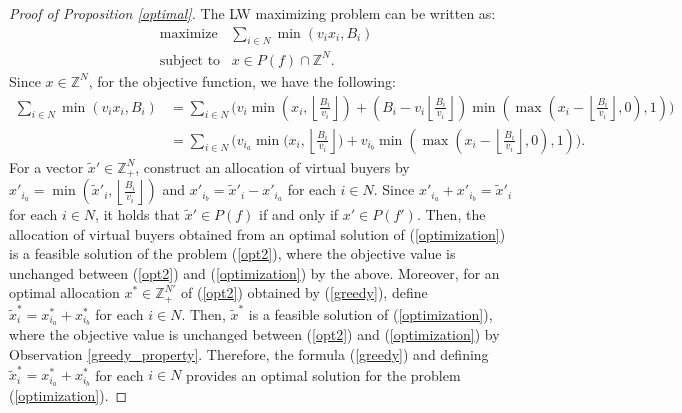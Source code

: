 \documentclass[letterpaper,11pt]{article}
\begin{document}
\begin{proof}[Proof of Proposition \ref{optimal}]
	The LW maximizing problem can be written as:
	\begin{align}
	\label{optimization}
	&{\text{maximize}}\ \ \ \ \sum_{i\in N}\min(v_i x_i,B_i) \\
	&\text{subject to}\ \ \ \, x\in P(f)\cap \mathbb Z^N. \nonumber
	\end{align}
	Since $x\in\mathbb Z^N$, for the objective function, we have the following: 
	\begin{align*}
	\sum_{i\in N}\min(v_i x_i,B_i)&=\sum_{i\in N}\bigl(v_{i}\min(x_{i},\left\lfloor \frac{B_i}{v_i}\right\rfloor)+(B_i-v_i\left\lfloor \frac{B_i}{v_i}\right\rfloor)\min(\max(x_{i}-\left\lfloor \frac{B_i}{v_i}\right\rfloor,0),1)\bigr)\\
	&=\sum_{i\in N}\bigl(v_{i_a}\min\bigl(x_{i},\left\lfloor \frac{B_i}{v_i}\right\rfloor\bigr)+v_{i_b}\min(\max(x_{i}-\left\lfloor \frac{B_i}{v_i}\right\rfloor,0),1)\bigr).
	\end{align*}
	For a vector $\tilde{x}'\in \mathbb Z^N_{+}$, construct an allocation of virtual buyers by 
	$x'_{i_a}=\min(\tilde{x}'_i, \left\lfloor \frac{B_i}{v_i}\right\rfloor)$ and $x'_{i_b}=\tilde{x}'_i-x'_{i_a}$ for each $i\in N$.
	Since $x'_{i_a}+x'_{i_b}=\tilde{x}'_i$ for each $i\in N$, 
	it holds that $\tilde{x}'\in P(f)$ if and only if $x'\in P(f')$.
	Then, the allocation of virtual buyers obtained from an optimal solution of (\ref{optimization}) is a feasible solution of 
	the problem (\ref{opt2}), where the objective value is unchanged between (\ref{opt2}) 
	and (\ref{optimization}) by the above.
	Moreover, for an optimal allocation $x^{*}\in \mathbb Z^{N'}_{+}$ of (\ref{opt2}) obtained by (\ref{greedy}), 
	define $\tilde{x}^*_i=x^*_{i_a}+x^*_{i_b}$ for each $i\in N$.
	Then, $\tilde{x}^*$ is a feasible solution of (\ref{optimization}), 
	where the objective value is unchanged between (\ref{opt2}) 
	and (\ref{optimization}) by Observation \ref{greedy_property}.
	Therefore, the formula (\ref{greedy}) and defining $\tilde{x}^*_i=x^*_{i_a}+x^*_{i_b}$ for each $i\in N$ 
	provides an optimal solution for the problem (\ref{optimization}).
\end{proof}
\end{document}

